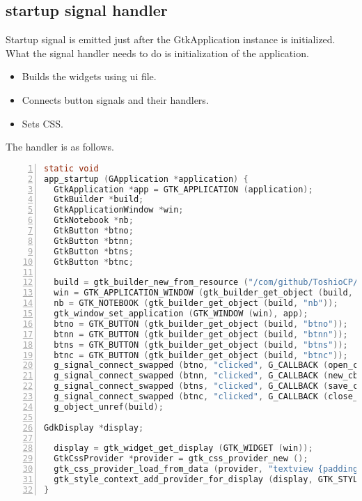 \hypertarget{startup-signal-handler}{%
\subsection{startup signal handler}\label{startup-signal-handler}}

Startup signal is emitted just after the GtkApplication instance is
initialized. What the signal handler needs to do is initialization of
the application.

\begin{itemize}
\tightlist
\item
  Builds the widgets using ui file.
\item
  Connects button signals and their handlers.
\item
  Sets CSS.
\end{itemize}

The handler is as follows.

\begin{lstlisting}[language=C, numbers=left]
static void
app_startup (GApplication *application) {
  GtkApplication *app = GTK_APPLICATION (application);
  GtkBuilder *build;
  GtkApplicationWindow *win;
  GtkNotebook *nb;
  GtkButton *btno;
  GtkButton *btnn;
  GtkButton *btns;
  GtkButton *btnc;

  build = gtk_builder_new_from_resource ("/com/github/ToshioCP/tfe/tfe.ui");
  win = GTK_APPLICATION_WINDOW (gtk_builder_get_object (build, "win"));
  nb = GTK_NOTEBOOK (gtk_builder_get_object (build, "nb"));
  gtk_window_set_application (GTK_WINDOW (win), app);
  btno = GTK_BUTTON (gtk_builder_get_object (build, "btno"));
  btnn = GTK_BUTTON (gtk_builder_get_object (build, "btnn"));
  btns = GTK_BUTTON (gtk_builder_get_object (build, "btns"));
  btnc = GTK_BUTTON (gtk_builder_get_object (build, "btnc"));
  g_signal_connect_swapped (btno, "clicked", G_CALLBACK (open_cb), nb);
  g_signal_connect_swapped (btnn, "clicked", G_CALLBACK (new_cb), nb);
  g_signal_connect_swapped (btns, "clicked", G_CALLBACK (save_cb), nb);
  g_signal_connect_swapped (btnc, "clicked", G_CALLBACK (close_cb), nb);
  g_object_unref(build);

GdkDisplay *display;

  display = gtk_widget_get_display (GTK_WIDGET (win));
  GtkCssProvider *provider = gtk_css_provider_new ();
  gtk_css_provider_load_from_data (provider, "textview {padding: 10px; font-family: monospace; font-size: 12pt;}", -1);
  gtk_style_context_add_provider_for_display (display, GTK_STYLE_PROVIDER (provider), GTK_STYLE_PROVIDER_PRIORITY_APPLICATION);
}
\end{lstlisting}

